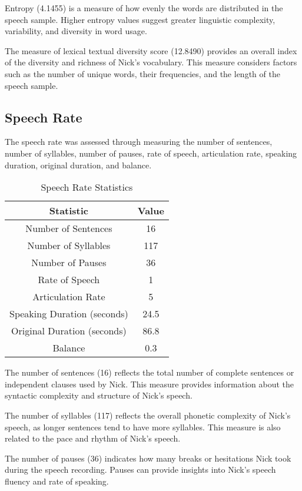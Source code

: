 \documentclass{article}
\begin{document}
Entropy (4.1455) is a measure of how evenly the words are distributed in the speech sample. Higher entropy values suggest greater linguistic complexity, variability, and diversity in word usage.

The measure of lexical textual diversity score (12.8490) provides an overall index of the diversity and richness of Nick's vocabulary. This measure considers factors such as the number of unique words, their frequencies, and the length of the speech sample.

\subsection{Speech Rate}

The speech rate was assessed through measuring the number of sentences, number of syllables, number of pauses, rate of speech, articulation rate, speaking duration, original duration, and balance.

\begin{table}[H]
\centering
\caption{Speech Rate Statistics}
\begin{tabular}{|c|c|}
\hline
\textbf{Statistic} & \textbf{Value} \\ \hline
Number of Sentences & 16 \\ \hline
Number of Syllables & 117 \\ \hline
Number of Pauses & 36 \\ \hline
Rate of Speech & 1 \\ \hline
Articulation Rate & 5 \\ \hline
Speaking Duration (seconds) & 24.5 \\ \hline
Original Duration (seconds) & 86.8 \\ \hline
Balance & 0.3 \\ \hline
\end{tabular}
\end{table}

The number of sentences (16) reflects the total number of complete sentences or independent clauses used by Nick. This measure provides information about the syntactic complexity and structure of Nick's speech.

The number of syllables (117) reflects the overall phonetic complexity of Nick's speech, as longer sentences tend to have more syllables. This measure is also related to the pace and rhythm of Nick's speech.

The number of pauses (36) indicates how many breaks or hesitations Nick took during the speech recording. Pauses can provide insights into Nick's speech fluency and rate of speaking.
\end{document}
